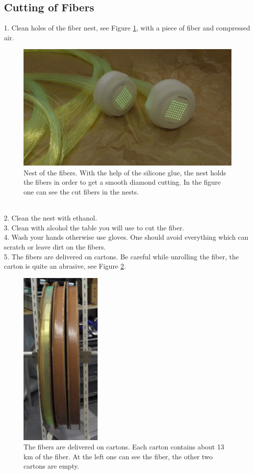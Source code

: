\documentclass[a4paper]{article}\linespread{1.4}
\begin{document}
\subsection{Cutting of Fibers }
1.	Clean holes of the fiber nest, see Figure \ref{fig:nestf}, with a piece of fiber and compressed air.
\begin{figure}[h!] \hspace*{-0.5cm} \includegraphics[width=135mm,scale=2.0]{figures/nestfpaint.jpg} \caption{Nest of the fibers. With the help of the silicone glue, the nest holds the fibers in order to get a smooth diamond cutting. In the figure one can see the cut fibers in the nests.}  \label{fig:nestf}\end{figure}
\\2.	Clean the nest with ethanol.
\\3.	Clean  with alcohol the table you will use to cut the fiber.
\\4.	Wash your hands otherwise use gloves. One should avoid everything which can scratch or leave dirt on the fibers.
\\5.	The fibers are delivered on cartons. Be careful while unrolling the fiber, the carton is quite an abrasive, see Figure \ref{fig:carton}.
\begin{figure}[h!] \centering \includegraphics[width=40mm,scale=2.0]{figures/cartonpaint.png} \caption{The fibers are delivered on cartons. Each carton contains about 13 km of the fiber. At the left one can see the fiber, the other two cartons are empty.}  \label{fig:carton}\end{figure}
\end{document}
